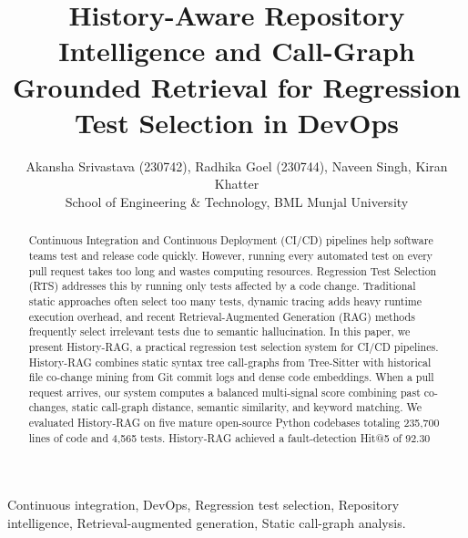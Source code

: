 \documentclass[12pt,onecolumn,draftclsnofoot]{IEEEtran}
\begin{document}
\title{History-Aware Repository Intelligence and Call-Graph Grounded Retrieval for Regression Test Selection in DevOps}

\author{Akansha Srivastava (230742), Radhika Goel (230744), Naveen Singh, Kiran Khatter\\
School of Engineering \& Technology, BML Munjal University}

\maketitle

\begin{abstract}
Continuous Integration and Continuous Deployment (CI/CD) pipelines help software teams test and release code quickly. However, running every automated test on every pull request takes too long and wastes computing resources. Regression Test Selection (RTS) addresses this by running only tests affected by a code change. Traditional static approaches often select too many tests, dynamic tracing adds heavy runtime execution overhead, and recent Retrieval-Augmented Generation (RAG) methods frequently select irrelevant tests due to semantic hallucination. In this paper, we present History-RAG, a practical regression test selection system for CI/CD pipelines. History-RAG combines static syntax tree call-graphs from Tree-Sitter with historical file co-change mining from Git commit logs and dense code embeddings. When a pull request arrives, our system computes a balanced multi-signal score combining past co-changes, static call-graph distance, semantic similarity, and keyword matching. We evaluated History-RAG on five mature open-source Python codebases totaling 235,700 lines of code and 4,565 tests. History-RAG achieved a fault-detection Hit@5 of 92.30%
\end{abstract}

\begin{IEEEkeywords}
Continuous integration, DevOps, Regression test selection, Repository intelligence, Retrieval-augmented generation, Static call-graph analysis.
\end{IEEEkeywords}
\end{document}
